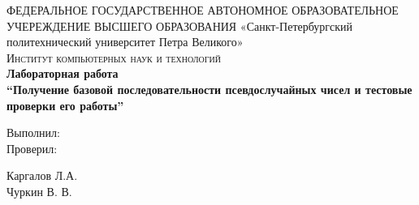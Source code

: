 \documentclass{article}
\begin{document}
	\begin{titlepage}
		\center 
		ФЕДЕРАЛЬНОЕ ГОСУДАРСТВЕННОЕ АВТОНОМНОЕ ОБРАЗОВАТЕЛЬНОЕ УЧЕРЕЖДЕНИЕ ВЫСШЕГО ОБРАЗОВАНИЯ\linebreak  
		«Санкт-Петербургский политехнический университет Петра Великого»\\[2cm]
		\textsc{\Large Институт компьютерных наук и технологий}\\[6.5cm]
		
		{\huge \bfseries Лабораторная работа\\[0.4cm]
			\Large \mdseries “Получение базовой последовательности псевдослучайных чисел и тестовые проверки его работы”}\\[6.5cm]
		
		\begin{multicols}{2}
			\begin{flushright} \large
				
				{Выполнил:}\\[0.5cm]
				
				{Проверил:}
				
			\end{flushright}
			\begin{flushright}
				
				{Каргалов Л.А.}\\[0.5cm]
				
				{Чуркин В. В.}
				
			\end{flushright}
		\end{multicols}

		\flushright{
			{\today}\\[0.5cm]
		}
		
		\vfill %
	\end{titlepage}
	
	\tableofcontents
	\setcounter{page}{2}
	\newpage
	
\end{document}
